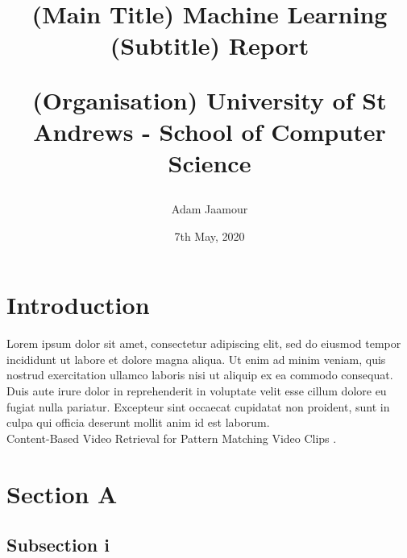 \documentclass[letterpaper,12pt]{article}
\begin{document}
\title{
    (Main Title) Machine Learning\\ (Subtitle) Report\\
    \begin{large}
    (Organisation) University of St Andrews - School of Computer Science
    \end{large}
}
\author{Adam Jaamour} %
\date{7th May, 2020}
\maketitle
\newpage

\tableofcontents
\newpage


\section{Introduction}
\label{sec:introduction}

Lorem ipsum dolor sit amet, consectetur adipiscing elit, sed do eiusmod tempor incididunt ut labore et dolore magna aliqua. Ut enim ad minim veniam, quis nostrud exercitation ullamco laboris nisi ut aliquip ex ea commodo consequat. Duis aute irure dolor in reprehenderit in voluptate velit esse cillum dolore eu fugiat nulla pariatur. Excepteur sint occaecat cupidatat non proident, sunt in culpa qui officia deserunt mollit anim id est laborum.\\

Content-Based Video Retrieval for Pattern Matching Video Clips \cite{Jaamour2019}.


\section{Section A}
\label{sec:section-A}

\subsection{Subsection i}
\end{document}
